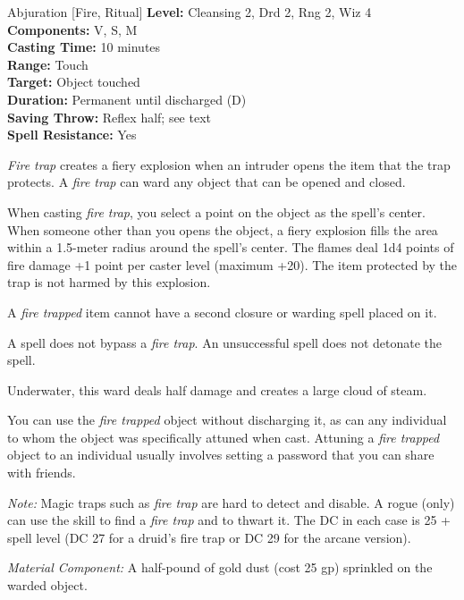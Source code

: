 {Abjuration [Fire, Ritual]}
{
	\textbf{Level:}
	Cleansing 2, Drd 2, Rng 2, Wiz 4\\
	\textbf{Components:}
	V, S, M\\
	\textbf{Casting Time:}
	10 minutes\\
	\textbf{Range:}
	Touch\\
	\textbf{Target:}
	Object touched\\
	\textbf{Duration:}
	Permanent until discharged (D)\\
	\textbf{Saving Throw:}
	Reflex half; see text\\
	\textbf{Spell Resistance:}
	Yes\\
}
{
	\emph{Fire trap} creates a fiery explosion when an intruder opens the item that the trap protects. A \emph{fire trap} can ward any object that can be opened and closed.

	When casting \emph{fire trap}, you select a point on the object as the spell's center. When someone other than you opens the object, a fiery explosion fills the area within a 1.5-meter radius around the spell's center. The flames deal 1d4 points of fire damage +1 point per caster level (maximum +20). The item protected by the trap is not harmed by this explosion.

	A \emph{fire trapped} item cannot have a second closure or warding spell placed on it.

	A  spell does not bypass a \emph{fire trap}.  An unsuccessful  spell does not detonate the spell.

	Underwater, this ward deals half damage and creates a large cloud of steam.

	You can use the \emph{fire trapped} object without discharging it, as can any individual to whom the object was specifically attuned when cast. Attuning a \emph{fire trapped} object to an individual usually involves setting a password that you can share with friends.

	\textit{Note:} Magic traps such as \emph{fire trap} are hard to detect and disable. A rogue (only) can use the  skill to find a \emph{fire trap} and  to thwart it. The DC in each case is 25 + spell level (DC 27 for a druid's fire trap or DC 29 for the arcane version).

	\textit{Material Component:}
	A half-pound of gold dust (cost 25 gp) sprinkled on the warded object.

}
